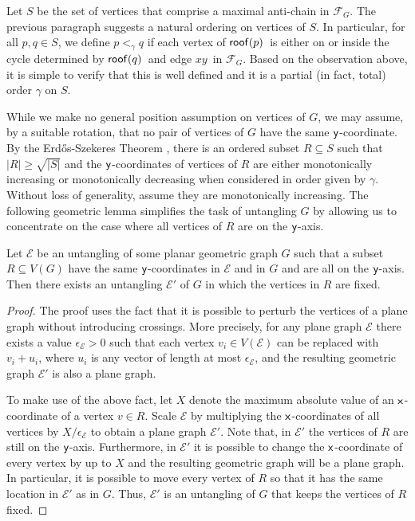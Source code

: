\documentclass[lotsofwhite,charterfonts, letter]{patmorin}
\newcommand{\x}{\ensuremath{\protect\textup{\textsf{x}}}}
\newcommand{\y}{\ensuremath{\protect\textup{\textsf{y}}}}
\newcommand{\fg}{\ensuremath{\mathcal{F}_G}}
\newcommand{\xx}{\ensuremath{x}}
\newcommand{\yy}{\ensuremath{y}}
\newcommand{\rf}[1]{\ensuremath{\textup{\textsf{roof}}(#1)}}
\begin{document}
Let $S$ be the set of vertices that comprise a maximal anti-chain in
\fg. The previous paragraph suggests a natural ordering on vertices of
$S$. In particular, for all $p,q\in S$, we define $p<_\gamma q$ if
each vertex of \rf{p}\ is either on or inside the cycle determined by \rf{q}\ and edge \xx\yy\ in \fg. Based on the observation above, it is simple to verify that this is well defined and it is a partial (in fact, total) order $\gamma$ on $S$.

While we make no general position assumption on vertices of $G$, we
may assume, by a suitable rotation, that no pair of vertices of $G$
have the same \y-coordinate. 
By the Erd{\H{o}}s-Szekeres Theorem \cite{ES35}, there is an ordered
subset $R\subseteq S$ such that $|R|\geq \sqrt{|S|}$ and the
\y-coordinates of vertices of $R$ are either monotonically increasing
or monotonically decreasing when considered in order given by
$\gamma$. Without loss of generality, assume they are monotonically
increasing.
The following geometric lemma simplifies the task of untangling $G$ by allowing us
to concentrate on the case where all vertices of $R$ are on the
\y-axis.

\begin{lem}
Let $\mathcal{E}$ be an untangling of some planar geometric graph $G$ 
such that a subset $R\subseteq
V(G)$ have the same \y-coordinates in $\mathcal{E}$ and in $G$ and are all on
the \y-axis.  Then there
exists an untangling $\mathcal{E}'$ of $G$ in which the vertices in
$R$ are fixed.
\end{lem}

\begin{proof}
The proof uses the fact that it is possible to perturb the vertices of
a plane graph without introducing crossings.  More precisely, for any
plane graph $\mathcal{E}$ there exists a value $\epsilon_{\mathcal{E}}>0$ such that each
vertex $v_i\in V(\mathcal{E})$ can be replaced with $v_i+u_i$, where $u_i$ is any
vector of length at most $\epsilon_{\mathcal{E}}$, and the resulting
geometric graph $\mathcal{E}'$ is also a plane graph.

To make use of the above fact,
let $X$ denote the maximum absolute value of an \x-coordinate of a
vertex $v\in R$.  Scale $\mathcal{E}$ by
multiplying the \x-coordinates of all vertices by
$X/\epsilon_{\mathcal{E}}$ to
obtain a plane graph $\mathcal{E}'$. Note that, in $\mathcal{E}'$ the
vertices of $R$ are still on the \y-axis.  Furthermore, in
$\mathcal{E'}$ it is 
possible to change
the \x-coordinate of every vertex by up to $X$ and the resulting
geometric graph will be a plane graph.  In particular, it is possible
to move every vertex of $R$ so that it has the same location in
$\mathcal{E}'$
as in $G$.  Thus, $\mathcal{E}'$ is an untangling of $G$ that keeps the vertices
of $R$ fixed.
\end{proof}
\end{document}
